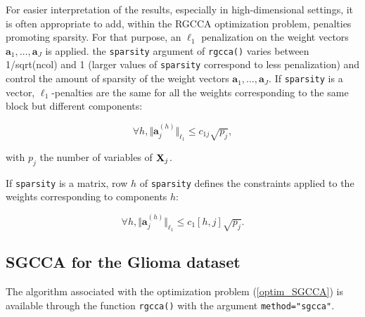 \documentclass[
]{jss}
\begin{document}
\normalsize

For easier interpretation of the results, especially in high-dimensional
settings, it is often appropriate to add, within the RGCCA optimization
problem, penalties promoting sparsity. For that purpose, an \(\ell_1\)
penalization on the weight vectors
\(\mathbf{a}_1, \ldots, \mathbf{a}_J\) is applied. the \texttt{sparsity}
argument of \texttt{rgcca()} varies between 1/sqrt(ncol) and 1 (larger
values of \texttt{sparsity} correspond to less penalization) and control
the amount of sparsity of the weight vectors
\(\mathbf{a}_1, \ldots, \mathbf{a}_J\). If \texttt{sparsity} is a
vector, \(\ell_1\)-penalties are the same for all the weights
corresponding to the same block but different components:

\begin{equation}
\forall h, \Vert \mathbf{a}_j^{(h)} \Vert_{\ell_1} \leq c_{1j} \sqrt{p_j},
\end{equation}

with \(p_j\) the number of variables of \(\mathbf{X}_j\).

If \texttt{sparsity} is a matrix, row \(h\) of \texttt{sparsity} defines
the constraints applied to the weights corresponding to components
\(h\):

\begin{equation}
\forall h, \Vert \mathbf{a}_j^{(h)} \Vert_{\ell_1} \leq c_1[h,j] \sqrt{p_j}.
\end{equation}

\hypertarget{sgcca-for-the-glioma-dataset}{%
\subsection{SGCCA for the Glioma
dataset}\label{sgcca-for-the-glioma-dataset}}

The algorithm associated with the optimization problem
(\ref{optim_SGCCA}) is available through the function \texttt{rgcca()}
with the argument \texttt{method="sgcca"}.

\footnotesize
\end{document}

